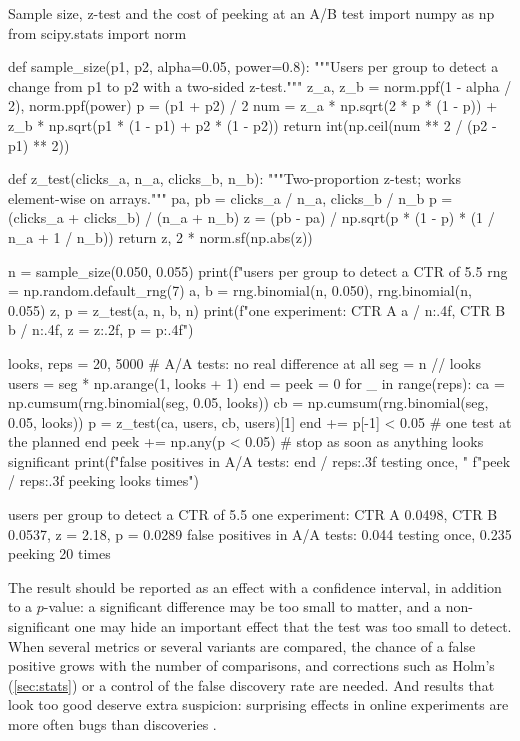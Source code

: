 \begin{pylisting}[label={lst:abtest}]{Sample size, z-test and the cost of peeking at an A/B test}
import numpy as np
from scipy.stats import norm

def sample_size(p1, p2, alpha=0.05, power=0.8):
    """Users per group to detect a change from p1 to p2 with a two-sided z-test."""
    z_a, z_b = norm.ppf(1 - alpha / 2), norm.ppf(power)
    p = (p1 + p2) / 2
    num = z_a * np.sqrt(2 * p * (1 - p)) + z_b * np.sqrt(p1 * (1 - p1) + p2 * (1 - p2))
    return int(np.ceil(num ** 2 / (p2 - p1) ** 2))

def z_test(clicks_a, n_a, clicks_b, n_b):
    """Two-proportion z-test; works element-wise on arrays."""
    pa, pb = clicks_a / n_a, clicks_b / n_b
    p = (clicks_a + clicks_b) / (n_a + n_b)
    z = (pb - pa) / np.sqrt(p * (1 - p) * (1 / n_a + 1 / n_b))
    return z, 2 * norm.sf(np.abs(z))

n = sample_size(0.050, 0.055)
print(f"users per group to detect a CTR of 5.5%
rng = np.random.default_rng(7)
a, b = rng.binomial(n, 0.050), rng.binomial(n, 0.055)
z, p = z_test(a, n, b, n)
print(f"one experiment: CTR A {a / n:.4f}, CTR B {b / n:.4f}, z = {z:.2f}, p = {p:.4f}")

looks, reps = 20, 5000                       # A/A tests: no real difference at all
seg = n // looks
users = seg * np.arange(1, looks + 1)
end = peek = 0
for _ in range(reps):
    ca = np.cumsum(rng.binomial(seg, 0.05, looks))
    cb = np.cumsum(rng.binomial(seg, 0.05, looks))
    p = z_test(ca, users, cb, users)[1]
    end += p[-1] < 0.05                       # one test at the planned end
    peek += np.any(p < 0.05)                  # stop as soon as anything looks significant
print(f"false positives in A/A tests: {end / reps:.3f} testing once, "
      f"{peek / reps:.3f} peeking {looks} times")
\end{pylisting}
\begin{pyoutput}
users per group to detect a CTR of 5.5%
one experiment: CTR A 0.0498, CTR B 0.0537, z = 2.18, p = 0.0289
false positives in A/A tests: 0.044 testing once, 0.235 peeking 20 times
\end{pyoutput}

The result should be reported as an effect with a confidence interval, in addition to a $p$-value: a significant difference may be too
small to matter, and a non-significant one may hide an important effect that the test was too small to detect. When several metrics or
several variants are compared, the chance of a false positive grows with the number of comparisons, and corrections such as Holm's
(\cref{sec:stats}) or a control of the false discovery rate are needed. And results that look too good deserve extra suspicion:
surprising effects in online experiments are more often bugs than discoveries \citep{kohavi2020trustworthy}.

